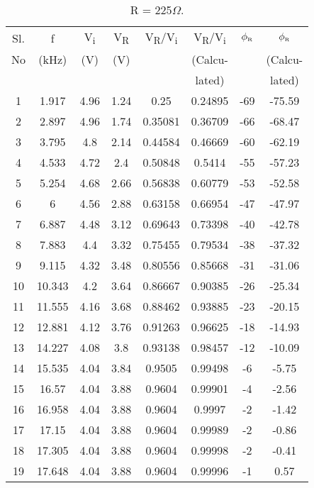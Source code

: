 \documentclass[a4paper]{article}
\begin{document}
\begin{table}[H]
  \begin{center}
    \caption{R = 225$\Omega$.}
    \label{tab:table1}
\resizebox{8.8cm}{!} {
   \begin{tabular}{|c|c|c|c|c|c|c|c|}
   \hline
Sl. & f & V\textsubscript{\tiny i} & V\textsubscript{\tiny R} &  V\textsubscript{\tiny R}/V\textsubscript{\tiny i} & V\textsubscript{\tiny R}/V\textsubscript{\tiny i} & $\phi\textsubscript{\tiny R}$ & $\phi\textsubscript{\tiny R}$\\
No & (kHz) & (V) &(V) &  & (Calcu- & & (Calcu- \\
 &  &  & &  & lated) & & lated) \\
\hline
1  & 1.917  & 4.96 & 1.24 & 0.25    & 0.24895 & -69 & -75.59 \\
2  & 2.897  & 4.96 & 1.74 & 0.35081 & 0.36709 & -66 & -68.47 \\
3  & 3.795  & 4.8  & 2.14 & 0.44584 & 0.46669 & -60 & -62.19 \\
4  & 4.533  & 4.72 & 2.4  & 0.50848 & 0.5414  & -55 & -57.23 \\
5  & 5.254  & 4.68 & 2.66 & 0.56838 & 0.60779 & -53 & -52.58 \\
6  & 6      & 4.56 & 2.88 & 0.63158 & 0.66954 & -47 & -47.97 \\
7  & 6.887  & 4.48 & 3.12 & 0.69643 & 0.73398 & -40 & -42.78 \\
8  & 7.883  & 4.4  & 3.32 & 0.75455 & 0.79534 & -38 & -37.32 \\
9  & 9.115  & 4.32 & 3.48 & 0.80556 & 0.85668 & -31 & -31.06 \\
10 & 10.343 & 4.2  & 3.64 & 0.86667 & 0.90385 & -26 & -25.34 \\
11 & 11.555 & 4.16 & 3.68 & 0.88462 & 0.93885 & -23 & -20.15 \\
12 & 12.881 & 4.12 & 3.76 & 0.91263 & 0.96625 & -18 & -14.93 \\
13 & 14.227 & 4.08 & 3.8  & 0.93138 & 0.98457 & -12 & -10.09 \\
14 & 15.535 & 4.04 & 3.84 & 0.9505  & 0.99498 & -6  & -5.75  \\
15 & 16.57  & 4.04 & 3.88 & 0.9604  & 0.99901 & -4  & -2.56  \\
16 & 16.958 & 4.04 & 3.88 & 0.9604  & 0.9997  & -2  & -1.42  \\
17 & 17.15  & 4.04 & 3.88 & 0.9604  & 0.99989 & -2  & -0.86  \\
18 & 17.305 & 4.04 & 3.88 & 0.9604  & 0.99998 & -2  & -0.41  \\
19 & 17.648 & 4.04 & 3.88 & 0.9604  & 0.99996 & -1  & 0.57   \\

\end{tabular}}
\end{center}
\end{table}
\end{document}
